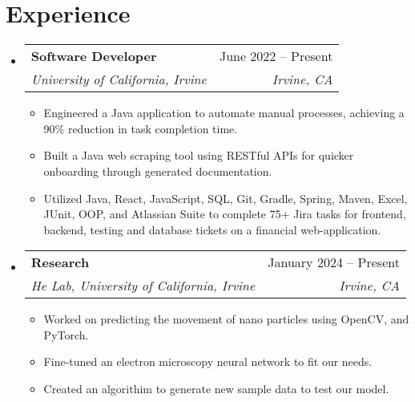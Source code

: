 \documentclass[letterpaper,11pt]{article}
\makeatletter
\newcommand{\resumeItem}[1]{
  \item\small{
    {#1 \vspace{-2pt}}
  }
}
\newcommand{\resumeSubheading}[4]{
  \vspace{-2pt}\item
    \begin{tabular*}{0.97\textwidth}[t]{l@{\extracolsep{\fill}}r}
      \textbf{#1} & #2 \\
      \textit{\small#3} & \textit{\small #4} \\
    \end{tabular*}\vspace{-7pt}
}
\newcommand{\resumeSubSubheading}[2]{
    \item
    \begin{tabular*}{0.97\textwidth}{l@{\extracolsep{\fill}}r}
      \textit{\small#1} & \textit{\small #2} \\
    \end{tabular*}\vspace{-7pt}
}
\newcommand{\resumeSubHeadingListStart}{\begin{itemize}[leftmargin=0.15in, label={}]}
\newcommand{\resumeSubHeadingListEnd}{\end{itemize}}
\newcommand{\resumeItemListStart}{\begin{itemize}}
\newcommand{\resumeItemListEnd}{\end{itemize}\vspace{-5pt}}
\makeatother
\begin{document}
\section{Experience}
  \resumeSubHeadingListStart

    \resumeSubheading
      {Software Developer}{June 2022 -- Present}
      {University of California, Irvine}{Irvine, CA}
      \resumeItemListStart
        \resumeItem{Engineered a Java application to automate manual processes, achieving a 90\% reduction in task completion time.}
        \resumeItem{Built a Java web scraping tool using RESTful APIs for quicker onboarding through generated documentation.
        }
        \resumeItem{Utilized Java, React, JavaScript, SQL, Git, Gradle, Spring, Maven, Excel, JUnit, OOP, and Atlassian Suite to complete 75+ Jira tasks for frontend, backend, testing and database tickets on a financial web-application. 
        }
      \resumeItemListEnd
    \resumeSubheading
      {Research}{January 2024 -- Present}
      {He Lab, University of California, Irvine}{Irvine, CA}
      \resumeItemListStart
        \resumeItem{Worked on predicting the movement of nano particles using OpenCV, and PyTorch.}
        \resumeItem{Fine-tuned an electron microscopy neural network to fit our needs.
        }
        \resumeItem{Created an algorithim to generate new sample data to test our model. 
        }
      \resumeItemListEnd
      

  \resumeSubHeadingListEnd


\end{document}

